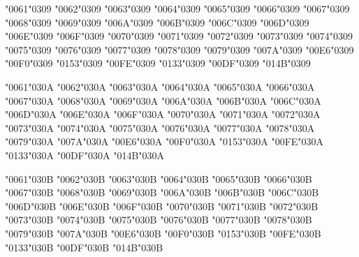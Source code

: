 {\textsc{\char"0061\char"0309} \textsc{\char"0062\char"0309} \textsc{\char"0063\char"0309} \textsc{\char"0064\char"0309} \textsc{\char"0065\char"0309} \textsc{\char"0066\char"0309} \textsc{\char"0067\char"0309} \textsc{\char"0068\char"0309} \textsc{\char"0069\char"0309} \textsc{\char"006A\char"0309} \textsc{\char"006B\char"0309} \textsc{\char"006C\char"0309} \textsc{\char"006D\char"0309} \textsc{\char"006E\char"0309} \textsc{\char"006F\char"0309} \textsc{\char"0070\char"0309} \textsc{\char"0071\char"0309} \textsc{\char"0072\char"0309} \textsc{\char"0073\char"0309} \textsc{\char"0074\char"0309} \textsc{\char"0075\char"0309} \textsc{\char"0076\char"0309} \textsc{\char"0077\char"0309} \textsc{\char"0078\char"0309} \textsc{\char"0079\char"0309} \textsc{\char"007A\char"0309} \textsc{\char"00E6\char"0309} \textsc{\char"00F0\char"0309} \textsc{\char"0153\char"0309} \textsc{\char"00FE\char"0309} \textsc{\char"0133\char"0309} \textsc{\char"00DF\char"0309} \textsc{\char"014B\char"0309}

\textsc{\char"0061\char"030A} \textsc{\char"0062\char"030A} \textsc{\char"0063\char"030A} \textsc{\char"0064\char"030A} \textsc{\char"0065\char"030A} \textsc{\char"0066\char"030A} \textsc{\char"0067\char"030A} \textsc{\char"0068\char"030A} \textsc{\char"0069\char"030A} \textsc{\char"006A\char"030A} \textsc{\char"006B\char"030A} \textsc{\char"006C\char"030A} \textsc{\char"006D\char"030A} \textsc{\char"006E\char"030A} \textsc{\char"006F\char"030A} \textsc{\char"0070\char"030A} \textsc{\char"0071\char"030A} \textsc{\char"0072\char"030A} \textsc{\char"0073\char"030A} \textsc{\char"0074\char"030A} \textsc{\char"0075\char"030A} \textsc{\char"0076\char"030A} \textsc{\char"0077\char"030A} \textsc{\char"0078\char"030A} \textsc{\char"0079\char"030A} \textsc{\char"007A\char"030A} \textsc{\char"00E6\char"030A} \textsc{\char"00F0\char"030A} \textsc{\char"0153\char"030A} \textsc{\char"00FE\char"030A} \textsc{\char"0133\char"030A} \textsc{\char"00DF\char"030A} \textsc{\char"014B\char"030A}

\textsc{\char"0061\char"030B} \textsc{\char"0062\char"030B} \textsc{\char"0063\char"030B} \textsc{\char"0064\char"030B} \textsc{\char"0065\char"030B} \textsc{\char"0066\char"030B} \textsc{\char"0067\char"030B} \textsc{\char"0068\char"030B} \textsc{\char"0069\char"030B} \textsc{\char"006A\char"030B} \textsc{\char"006B\char"030B} \textsc{\char"006C\char"030B} \textsc{\char"006D\char"030B} \textsc{\char"006E\char"030B} \textsc{\char"006F\char"030B} \textsc{\char"0070\char"030B} \textsc{\char"0071\char"030B} \textsc{\char"0072\char"030B} \textsc{\char"0073\char"030B} \textsc{\char"0074\char"030B} \textsc{\char"0075\char"030B} \textsc{\char"0076\char"030B} \textsc{\char"0077\char"030B} \textsc{\char"0078\char"030B} \textsc{\char"0079\char"030B} \textsc{\char"007A\char"030B} \textsc{\char"00E6\char"030B} \textsc{\char"00F0\char"030B} \textsc{\char"0153\char"030B} \textsc{\char"00FE\char"030B} \textsc{\char"0133\char"030B} \textsc{\char"00DF\char"030B} \textsc{\char"014B\char"030B}

}
